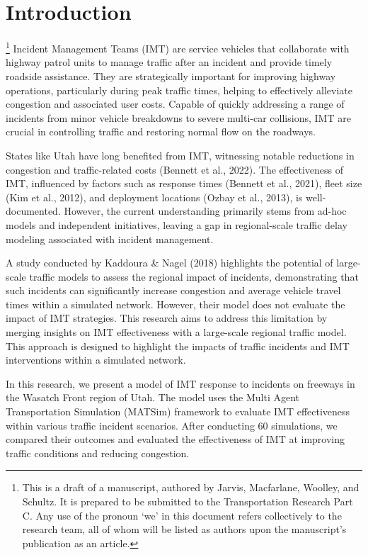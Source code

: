 \documentclass[fancy, oneside, mastersfancy, ms]{byuthesis}
\begin{document}
\hypertarget{introduction}{%
\chapter{Introduction}\label{introduction}}

\footnote{This is a draft of a manuscript, authored by Jarvis,
  Macfarlane, Woolley, and Schultz. It is prepared to be submitted to
  the Transportation Research Part C. Any use of the pronoun `we' in
  this document refers collectively to the research team, all of whom
  will be listed as authors upon the manuscript's publication as an
  article.} Incident Management Teams (IMT) are service vehicles that
collaborate with highway patrol units to manage traffic after an
incident and provide timely roadside assistance. They are strategically
important for improving highway operations, particularly during peak
traffic times, helping to effectively alleviate congestion and
associated user costs. Capable of quickly addressing a range of
incidents from minor vehicle breakdowns to severe multi-car collisions,
IMT are crucial in controlling traffic and restoring normal flow on the
roadways.

States like Utah have long benefited from IMT, witnessing notable
reductions in congestion and traffic-related costs (Bennett et al.,
2022). The effectiveness of IMT, influenced by factors such as response
times (Bennett et al., 2021), fleet size (Kim et al., 2012), and
deployment locations (Ozbay et al., 2013), is well-documented. However,
the current understanding primarily stems from ad-hoc models and
independent initiatives, leaving a gap in regional-scale traffic delay
modeling associated with incident management.

A study conducted by Kaddoura \& Nagel (2018) highlights the potential
of large-scale traffic models to assess the regional impact of
incidents, demonstrating that such incidents can significantly increase
congestion and average vehicle travel times within a simulated network.
However, their model does not evaluate the impact of IMT strategies.
This research aims to address this limitation by merging insights on IMT
effectiveness with a large-scale regional traffic model. This approach
is designed to highlight the impacts of traffic incidents and IMT
interventions within a simulated network.

In this research, we present a model of IMT response to incidents on
freeways in the Wasatch Front region of Utah. The model uses the Multi
Agent Transportation Simulation (MATSim) framework to evaluate IMT
effectiveness within various traffic incident scenarios. After
conducting 60 simulations, we compared their outcomes and evaluated the
effectiveness of IMT at improving traffic conditions and reducing
congestion.
\end{document}
